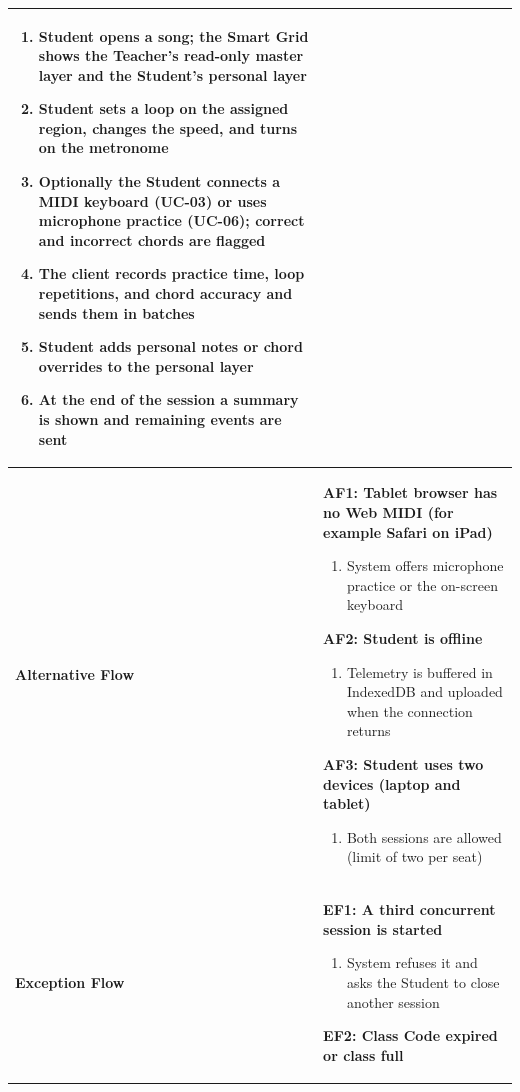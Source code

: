 \documentclass[a4paper]{article}
\newlength{\ucLeft}
\begin{document}
\begin{longtable}{|>{\bfseries}p{\ucLeft}|p{\dimexpr\linewidth-\ucLeft-2\tabcolsep-2\arrayrulewidth}|}
\begin{enumerate}[leftmargin=1.5em, nosep, topsep=2pt, partopsep=0pt, parsep=0pt, after=\strut]
    \item Student opens a song; the Smart Grid shows the Teacher's read-only master layer and the Student's personal layer
    \item Student sets a loop on the assigned region, changes the speed, and turns on the metronome
    \item Optionally the Student connects a MIDI keyboard (UC-03) or uses microphone practice (UC-06); correct and incorrect chords are flagged
    \item The client records practice time, loop repetitions, and chord accuracy and sends them in batches
    \item Student adds personal notes or chord overrides to the personal layer
    \item At the end of the session a summary is shown and remaining events are sent
\end{enumerate}
\\ \hline
Alternative Flow &
\textbf{AF1: Tablet browser has no Web MIDI (for example Safari on iPad)}
\begin{enumerate}[leftmargin=1.5em, nosep, topsep=2pt, partopsep=0pt, parsep=0pt, after=\strut]
    \item System offers microphone practice or the on-screen keyboard
\end{enumerate}
\textbf{AF2: Student is offline}
\begin{enumerate}[leftmargin=1.5em, nosep, topsep=2pt, partopsep=0pt, parsep=0pt, after=\strut]
    \item Telemetry is buffered in IndexedDB and uploaded when the connection returns
\end{enumerate}
\textbf{AF3: Student uses two devices (laptop and tablet)}
\begin{enumerate}[leftmargin=1.5em, nosep, topsep=2pt, partopsep=0pt, parsep=0pt, after=\strut]
    \item Both sessions are allowed (limit of two per seat)
\end{enumerate}
\\ \hline
Exception Flow &
\textbf{EF1: A third concurrent session is started}
\begin{enumerate}[leftmargin=1.5em, nosep, topsep=2pt, partopsep=0pt, parsep=0pt, after=\strut]
    \item System refuses it and asks the Student to close another session
\end{enumerate}
\textbf{EF2: Class Code expired or class full}
\begin{enumerate}[leftmargin=1.5em, nosep, topsep=2pt, partopsep=0pt, parsep=0pt, after=\strut]

\end{enumerate}
\end{longtable}
\end{document}
